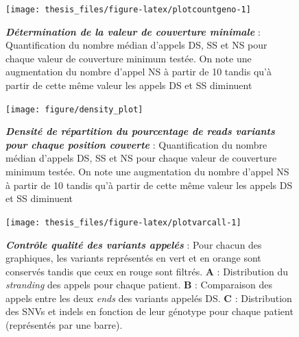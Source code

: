 \documentclass[12pt,a4paper,twoside]{ugathesis}
\theoremstyle{definition}
\theoremstyle{definition}
\theoremstyle{definition}
\theoremstyle{remark}
\begin{document}
\begin{figure}

{\centering \texttt{[image: thesis\_files/figure-latex/plotcountgeno-1]} 

}

\caption[Détermination de la valeur de couverture
minimale\\]{\textbf{\emph{Détermination de la valeur de
couverture minimale}} : Quantification du nombre médian d'appels DS, SS
et NS pour chaque valeur de couverture minimum testée. On note une
augmentation du nombre d'appel NS à partir de 10 tandis qu'à partir de
cette même valeur les appels DS et SS diminuent}\label{fig:plotcountgeno}
\end{figure}









\newpage

\begin{figure}

{\centering \texttt{[image: figure/density\_plot]} 

}

\caption[Densité de répartition du pourcentage de
\emph{reads} variants pour chaque position couverte\\]{\textbf{\emph{Densité de répartition du pourcentage
de \emph{reads} variants pour chaque position couverte}} :
Quantification du nombre médian d'appels DS, SS et NS pour chaque valeur
de couverture minimum testée. On note une augmentation du nombre d'appel
NS à partir de 10 tandis qu'à partir de cette même valeur les appels DS
et SS diminuent}\label{fig:plotdensityvar}
\end{figure}










\newpage

\begin{figure}

{\centering \texttt{[image: thesis\_files/figure-latex/plotvarcall-1]} 

}

\caption[Contrôle qualité des variants appelés]{\textbf{\emph{Contrôle qualité des variants appelés}}
: Pour chacun des graphiques, les variants représentés en vert et en
orange sont conservés tandis que ceux en rouge sont filtrés. \textbf{A}
: Distribution du \emph{stranding} des appels pour chaque patient.
\textbf{B} : Comparaison des appels entre les deux \emph{ends} des
variants appelés DS. \textbf{C} : Distribution des SNVs et indels en
fonction de leur génotype pour chaque patient (représentés par une
barre).}\label{fig:plotvarcall}
\end{figure}
\end{document}
